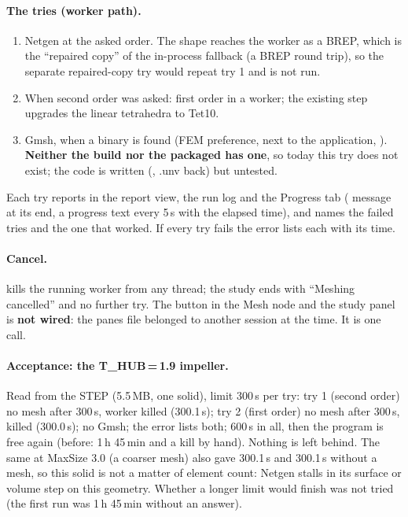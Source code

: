 \paragraph{The tries (worker path).}
\begin{enumerate}
  \item Netgen at the asked order. The shape reaches the worker as a BREP, which is the ``repaired copy'' of the in-process
        fallback (a BREP round trip), so the separate repaired-copy try would repeat try 1 and is not run.
  \item When second order was asked: first order in a worker; the existing step upgrades the linear tetrahedra to Tet10.
  \item Gmsh, when a  binary is found (FEM preference, next to the application, ). \textbf{Neither
        the build nor the packaged  has one}, so today this try does not exist; the code is written
        (, .unv back) but untested.
\end{enumerate}
Each try reports in the report view, the run log and the Progress tab ( message at its end,
a progress text every 5\,s with the elapsed time), and  names the failed tries and the one that worked.
If every try fails the error lists each with its time.

\paragraph{Cancel.}  kills the running worker from any thread; the study ends with
``Meshing cancelled'' and no further try. The button in the Mesh node and the study panel is \textbf{not wired}: the panes
file belonged to another session at the time. It is one call.

\paragraph{Acceptance: the T\_HUB\,=\,1.9 impeller.} Read from the STEP (5.5\,MB, one solid), limit 300\,s per try:
try 1 (second order) no mesh after 300\,s, worker killed (300.1\,s); try 2 (first order) no mesh after 300\,s, killed (300.0\,s);
no Gmsh; the error lists both; 600\,s in all, then the program is free again (before: 1\,h 45\,min and a kill by hand).
Nothing is left behind. The same at MaxSize 3.0 (a coarser mesh) also gave 300.1\,s and 300.1\,s without a mesh, so
this solid is not a matter of element count: Netgen stalls in its surface or volume step on this geometry. Whether a
longer limit would finish was not tried (the first run was 1\,h 45\,min without an answer).

